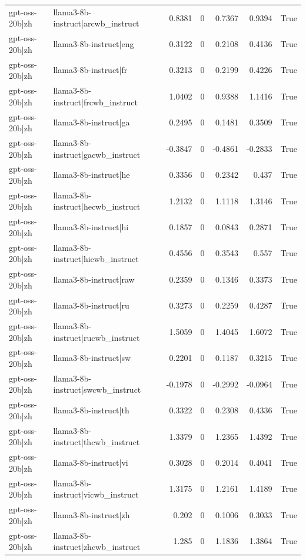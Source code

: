 \begin{table}
\begin{tabular}{l l r r r r l}
gpt-oss-20b|zh & llama3-8b-instruct|arcwb_instruct & 0.8381 & 0 & 0.7367 & 0.9394 & True \\
gpt-oss-20b|zh & llama3-8b-instruct|eng & 0.3122 & 0 & 0.2108 & 0.4136 & True \\
gpt-oss-20b|zh & llama3-8b-instruct|fr & 0.3213 & 0 & 0.2199 & 0.4226 & True \\
gpt-oss-20b|zh & llama3-8b-instruct|frcwb_instruct & 1.0402 & 0 & 0.9388 & 1.1416 & True \\
gpt-oss-20b|zh & llama3-8b-instruct|ga & 0.2495 & 0 & 0.1481 & 0.3509 & True \\
gpt-oss-20b|zh & llama3-8b-instruct|gacwb_instruct & -0.3847 & 0 & -0.4861 & -0.2833 & True \\
gpt-oss-20b|zh & llama3-8b-instruct|he & 0.3356 & 0 & 0.2342 & 0.437 & True \\
gpt-oss-20b|zh & llama3-8b-instruct|hecwb_instruct & 1.2132 & 0 & 1.1118 & 1.3146 & True \\
gpt-oss-20b|zh & llama3-8b-instruct|hi & 0.1857 & 0 & 0.0843 & 0.2871 & True \\
gpt-oss-20b|zh & llama3-8b-instruct|hicwb_instruct & 0.4556 & 0 & 0.3543 & 0.557 & True \\
gpt-oss-20b|zh & llama3-8b-instruct|raw & 0.2359 & 0 & 0.1346 & 0.3373 & True \\
gpt-oss-20b|zh & llama3-8b-instruct|ru & 0.3273 & 0 & 0.2259 & 0.4287 & True \\
gpt-oss-20b|zh & llama3-8b-instruct|rucwb_instruct & 1.5059 & 0 & 1.4045 & 1.6072 & True \\
gpt-oss-20b|zh & llama3-8b-instruct|sw & 0.2201 & 0 & 0.1187 & 0.3215 & True \\
gpt-oss-20b|zh & llama3-8b-instruct|swcwb_instruct & -0.1978 & 0 & -0.2992 & -0.0964 & True \\
gpt-oss-20b|zh & llama3-8b-instruct|th & 0.3322 & 0 & 0.2308 & 0.4336 & True \\
gpt-oss-20b|zh & llama3-8b-instruct|thcwb_instruct & 1.3379 & 0 & 1.2365 & 1.4392 & True \\
gpt-oss-20b|zh & llama3-8b-instruct|vi & 0.3028 & 0 & 0.2014 & 0.4041 & True \\
gpt-oss-20b|zh & llama3-8b-instruct|vicwb_instruct & 1.3175 & 0 & 1.2161 & 1.4189 & True \\
gpt-oss-20b|zh & llama3-8b-instruct|zh & 0.202 & 0 & 0.1006 & 0.3033 & True \\
gpt-oss-20b|zh & llama3-8b-instruct|zhcwb_instruct & 1.285 & 0 & 1.1836 & 1.3864 & True \\

\end{tabular}
\end{table}
